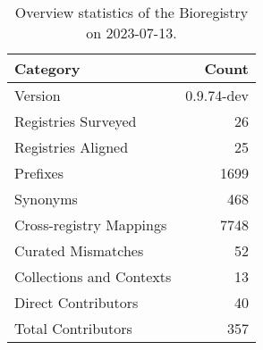 \begin{table}
\caption{Overview statistics of the Bioregistry on 2023-07-13.}
\label{tab:bioregistry-summary}
\begin{tabular}{lr}
\toprule
Category & Count \\
\midrule
Version & 0.9.74-dev \\
Registries Surveyed & 26 \\
Registries Aligned & 25 \\
Prefixes & 1699 \\
Synonyms & 468 \\
Cross-registry Mappings & 7748 \\
Curated Mismatches & 52 \\
Collections and Contexts & 13 \\
Direct Contributors & 40 \\
Total Contributors & 357 \\
\bottomrule
\end{tabular}
\end{table}

